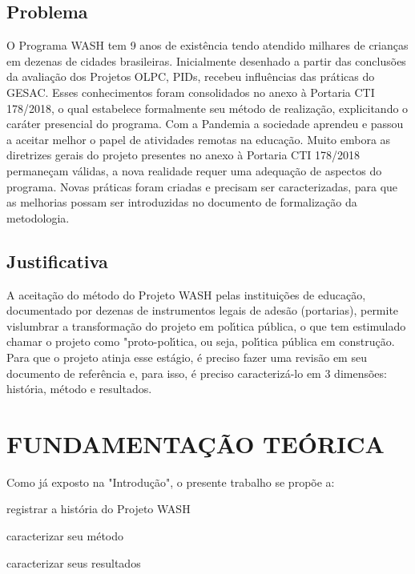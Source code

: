 \documentclass[
12pt,		%
openright,	%
twoside,  %
a4paper,			%
chapter=TITLE,		%
english,			%
french,				%
spanish,			%
brazil				%
]{USPSC-classe/USPSC}
\begin{document}
\section[Problema]{Problema}\label{Problema}
O Programa WASH tem 9 anos de exist\^encia tendo atendido milhares de crian\c{c}as em dezenas de cidades brasileiras. Inicialmente desenhado a partir das conclus\~oes da avalia\c{c}\~ao dos Projetos OLPC, PIDs, recebeu influ\^encias das pr\'aticas do GESAC. Esses conhecimentos foram consolidados no anexo \`a Portaria CTI 178/2018, o qual estabelece formalmente seu m\'etodo de realiza\c{c}\~ao, explicitando o car\'ater presencial do programa. Com a Pandemia a sociedade aprendeu e passou a aceitar melhor o papel de atividades remotas na educa\c{c}\~ao. Muito embora as diretrizes gerais do projeto presentes no anexo \`a Portaria CTI 178/2018 permane\c{c}am v\'alidas, a nova realidade requer uma adequa\c{c}\~ao de aspectos do programa. Novas pr\'aticas foram criadas e precisam ser caracterizadas, para que as melhorias possam ser introduzidas no documento de formaliza\c{c}\~ao da metodologia.


\section[Justificativa]{Justificativa}\label{Justificativa}
A aceita\c{c}\~ao do m\'etodo do Projeto WASH pelas institui\c{c}\~oes de educa\c{c}\~ao, documentado por dezenas de instrumentos legais de ades\~ao (portarias), permite vislumbrar a transforma\c{c}\~ao do projeto em pol\'{\i}tica p\'ublica, o que tem estimulado chamar o projeto como "proto-pol\'{\i}tica, ou seja, pol\'{\i}tica p\'ublica em constru\c{c}\~ao. Para que o projeto atinja esse est\'agio, \'e preciso fazer uma revis\~ao em seu documento de refer\^encia e, para isso, \'e preciso caracteriz\'a-lo em 3 dimens\~oes: hist\'oria, m\'etodo e resultados.


\chapter[FUNDAMENTA\c{C}\~AO TE\'ORICA ]{FUNDAMENTA\c{C}\~AO TE\'ORICA }\label{FUNDAMENTA\c{C}\~AO TE\'ORICA }
Como j\'a exposto na "Introdu\c{c}\~ao", o presente trabalho se prop\~oe a:



\begin{alineas}
\item registrar a hist\'oria do Projeto WASH
\item caracterizar seu m\'etodo
\item caracterizar seus resultados
\end{alineas}
\end{document}
